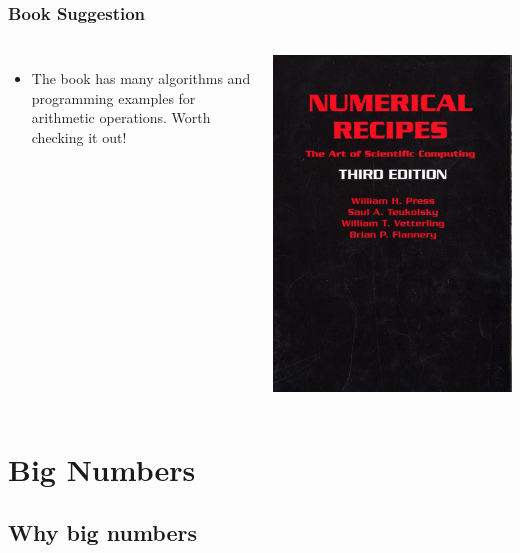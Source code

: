 \documentclass{beamer}
\begin{document}
\begin{frame}
  \frametitle{Book Suggestion}
  \begin{columns}[c]
    \begin{itemize}
    \item The book  has many algorithms
      and programming examples for arithmetic operations. Worth
      checking it out!
    \end{itemize}
    \includegraphics[width=1\textwidth]{img/numericalrecipes}
  \end{columns}
\end{frame}

\section{Big Numbers}
\subsection{Why big numbers}
\end{document}
